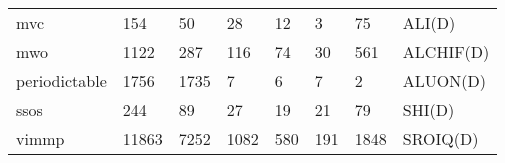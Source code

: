 \begin{table}
\begin{tabular}{m{3.5cm}m{1cm}m{1cm}m{1cm}m{1cm}m{1cm}m{1cm}m{1cm}}
mvc                     &       154 &                50 &         28 &                   12 &                      3 &                       75 &           ALI(D) \\
mwo                     &      1122 &               287 &        116 &                   74 &                     30 &                      561 &        ALCHIF(D) \\
periodictable           &      1756 &              1735 &          7 &                    6 &                      7 &                        2 &         ALUON(D) \\
ssos                    &       244 &                89 &         27 &                   19 &                     21 &                       79 &           SHI(D) \\
vimmp                   &     11863 &              7252 &       1082 &                  580 &                    191 &                     1848 &         SROIQ(D) \\
\bottomrule
\end{tabular}
\end{table}
